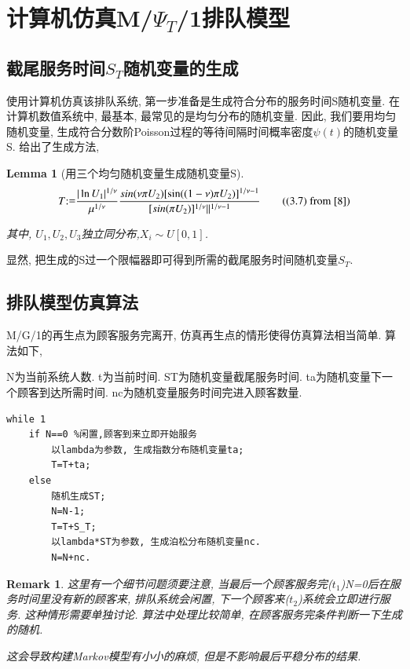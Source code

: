 \documentclass[a4paper, 12pt]{ctexart}
\newtheorem{lemma}[theorem]{Lemma}
\newtheorem*{remark}{Remark}
\begin{document}
\section{计算机仿真M/$\Psi_T$/1排队模型}
\subsection{截尾服务时间$S_T$随机变量的生成}
使用计算机仿真该排队系统, 第一步准备是生成符合分布的服务时间S随机变量. 在计算机数值系统中, 最基本, 最常见的是均匀分布的随机变量. 因此, 我们要用均匀随机变量, 生成符合分数阶Poisson过程的等待间隔时间概率密度$\psi(t)$的随机变量S. \cite{8}给出了生成方法,

\begin{lemma}[用三个均匀随机变量生成随机变量S]
\begin{equation}
T{:\mathrel{\mathop=}}\frac{|\ln U_1|^{1/\nu}}{\mu ^{1/\nu}}\frac{sin(\nu \pi U_2)[\sin((1-\nu)\pi U_2)]^{1/\nu-1}}{[sin(\pi U_2)]^{1/\nu}||^{1/\nu -1}} \tag{(3.7) from \cite{8}}
\end{equation}

其中, $U_1,U_2,U_3$独立同分布,$X_i\sim U[0,1]$.
\end{lemma}

显然, 把生成的S过一个限幅器即可得到所需的截尾服务时间随机变量$S_T$.

\subsection{排队模型仿真算法}
M/G/1的再生点为顾客服务完离开, 仿真再生点的情形使得仿真算法相当简单. 算法如下,

N为当前系统人数. t为当前时间. ST为随机变量截尾服务时间. ta为随机变量下一个顾客到达所需时间. nc为随机变量服务时间完进入顾客数量.

\begin{lstlisting}[caption=排队系统仿真伪代码]
while 1
    if N==0 %闲置,顾客到来立即开始服务
        以lambda为参数, 生成指数分布随机变量ta;
        T=T+ta;
    else
        随机生成ST;
        N=N-1;
        T=T+S_T;
        以lambda*ST为参数, 生成泊松分布随机变量nc.
        N=N+nc.
\end{lstlisting}

\begin{remark}
这里有一个细节问题须要注意, 当最后一个顾客服务完($t_1$)N=0后在服务时间里没有新的顾客来, 排队系统会闲置, 下一个顾客来($t_2$)系统会立即进行服务. 这种情形需要单独讨论. 算法中处理比较简单, 在顾客服务完条件判断一下生成的随机. 

这会导致构建Markov模型有小小的麻烦, 但是不影响最后平稳分布的结果.
\end{remark}
\end{document}
